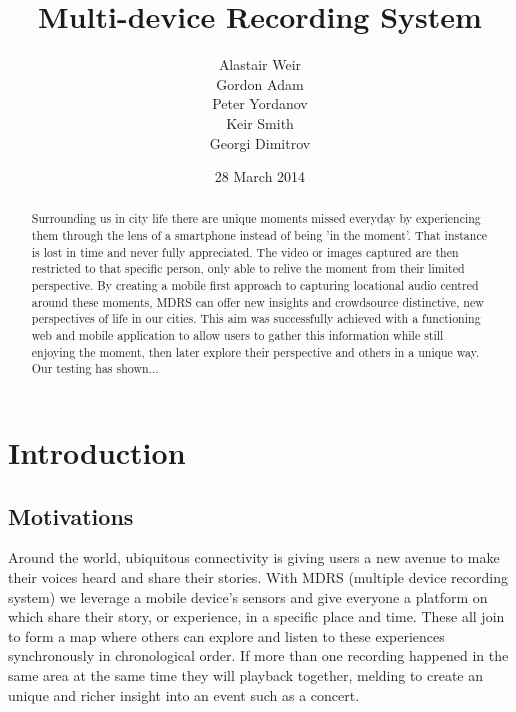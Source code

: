 \documentclass{l3proj}
\begin{document}
\setcounter{secnumdepth}{3}
\title{Multi-device Recording System}
\author{Alastair Weir \\
        Gordon Adam \\
        Peter Yordanov \\
        Keir Smith \\
        Georgi Dimitrov}
\date{28 March 2014}
\maketitle
\begin{abstract}

Surrounding us in city life there are unique moments missed everyday by experiencing  them through the lens of a smartphone instead of being 'in the moment'. That instance is lost in time and never fully appreciated. The video or images captured are then restricted to that specific person, only able to relive the moment from their limited perspective. By creating a mobile first approach to capturing locational audio centred around these moments, MDRS can offer new insights and crowdsource distinctive, new  perspectives of life in our cities. This aim was successfully achieved with a functioning web and mobile application to allow users to gather this information while still enjoying the moment, then later explore their perspective and others in a unique way. Our testing has shown...

\end{abstract}
\educationalconsent
\tableofcontents
\chapter{Introduction}
\label{intro}

\section{Motivations}
Around the world, ubiquitous connectivity is giving users a new avenue to make their voices heard and share their stories. With MDRS (multiple device recording system) we leverage a mobile device’s sensors and give everyone a platform on which share their story, or experience, in a specific place and time. These all join to form a map where others can explore and listen to these experiences synchronously in chronological order. If more than one recording happened in the same area at the same time they will playback together, melding to create an unique and richer insight into an event such as a concert.
\end{document}
